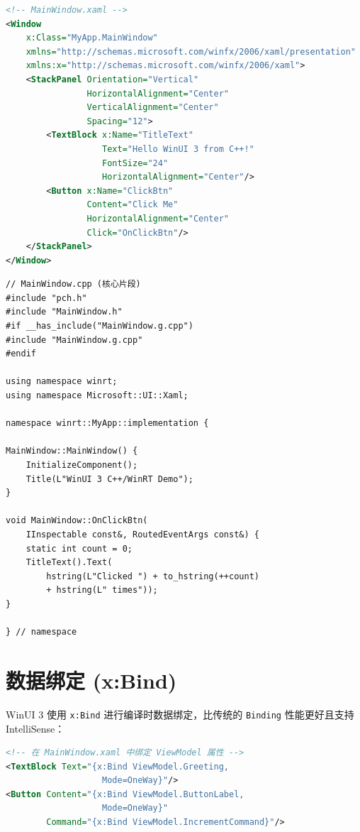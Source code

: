 \documentclass[12pt,a4paper,fontset=fandol]{ctexbook}
\newcommand{\cpplabel}{%
  \tcbox[on line,colback=cppheadbg,colframe=cppheadbg,
    boxrule=0pt,arc=1pt,left=2pt,right=2pt,top=1pt,bottom=1pt,
    colupper=white,fontupper=\scriptsize\bfseries]{C++}}
\newcommand{\xamllabel}{%
  \tcbox[on line,colback=xamlheadbg,colframe=xamlheadbg,
    boxrule=0pt,arc=1pt,left=2pt,right=2pt,top=1pt,bottom=1pt,
    colupper=white,fontupper=\scriptsize\bfseries]{XAML}}
\begin{document}
\xamllabel
\begin{lstlisting}[style=xamlstyle,language=XML]
<!-- MainWindow.xaml -->
<Window
    x:Class="MyApp.MainWindow"
    xmlns="http://schemas.microsoft.com/winfx/2006/xaml/presentation"
    xmlns:x="http://schemas.microsoft.com/winfx/2006/xaml">
    <StackPanel Orientation="Vertical"
                HorizontalAlignment="Center"
                VerticalAlignment="Center"
                Spacing="12">
        <TextBlock x:Name="TitleText"
                   Text="Hello WinUI 3 from C++!"
                   FontSize="24"
                   HorizontalAlignment="Center"/>
        <Button x:Name="ClickBtn"
                Content="Click Me"
                HorizontalAlignment="Center"
                Click="OnClickBtn"/>
    </StackPanel>
</Window>
\end{lstlisting}

\cpplabel
\begin{lstlisting}[style=cppstyle]
// MainWindow.cpp (核心片段)
#include "pch.h"
#include "MainWindow.h"
#if __has_include("MainWindow.g.cpp")
#include "MainWindow.g.cpp"
#endif

using namespace winrt;
using namespace Microsoft::UI::Xaml;

namespace winrt::MyApp::implementation {

MainWindow::MainWindow() {
    InitializeComponent();
    Title(L"WinUI 3 C++/WinRT Demo");
}

void MainWindow::OnClickBtn(
    IInspectable const&, RoutedEventArgs const&) {
    static int count = 0;
    TitleText().Text(
        hstring(L"Clicked ") + to_hstring(++count)
        + hstring(L" times"));
}

} // namespace
\end{lstlisting}

\section{数据绑定 (x:Bind)}

WinUI 3 使用 \texttt{x:Bind} 进行编译时数据绑定，比传统的 \texttt{Binding}
性能更好且支持 IntelliSense：

\xamllabel
\begin{lstlisting}[style=xamlstyle,language=XML]
<!-- 在 MainWindow.xaml 中绑定 ViewModel 属性 -->
<TextBlock Text="{x:Bind ViewModel.Greeting,
                   Mode=OneWay}"/>
<Button Content="{x:Bind ViewModel.ButtonLabel,
                   Mode=OneWay}"
        Command="{x:Bind ViewModel.IncrementCommand}"/>
\end{lstlisting}
\end{document}
